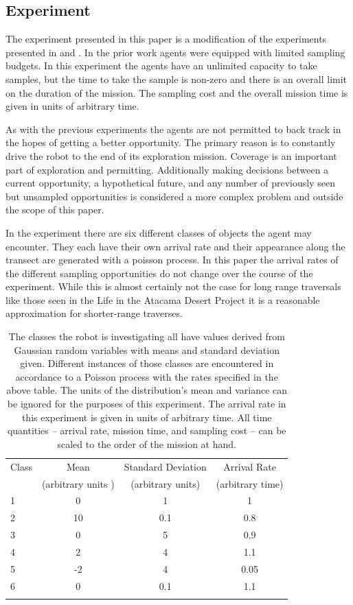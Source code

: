 \subsection{Experiment}

The experiment presented in this paper is a modification of the experiments
presented in \cite{furlong2014sequential} and \cite{furlong2014budgeting}.  In
the prior work agents were equipped with limited sampling budgets.  In this
experiment the agents have an unlimited capacity to take samples, but the time
to take the sample is non-zero and there is an overall limit on the duration of
the mission.  The sampling cost and the overall mission time is given in units of arbitrary time.

As with the previous experiments the agents are not permitted to back track in
the hopes of getting a better opportunity.  The primary reason is to constantly
drive the robot to the end of its exploration mission.  Coverage is an
important part of exploration and permitting.  Additionally making decisions
between a current opportunity, a hypothetical future, and any number of
previously seen but unsampled opportunities is considered a more complex
problem and outside the scope of this paper.

In the experiment there are six different classes of objects the agent may
encounter.  They each have their own arrival rate and their appearance along
the transect are generated with a poisson process.  In this paper the arrival
rates of the different sampling opportunities do not change over the course of
the experiment.  While this is almost certainly not the case for long range
traversals like those seen in the Life in the Atacama Desert Project it is a
reasonable approximation for shorter-range traverses.

\begin{table}[htpd!]
	\centering
	\begin{tabular}{l|ccc}
		Class & Mean & Standard Deviation & Arrival Rate\\
							 & (arbitrary units )  & (arbitrary units) & (arbitrary time)\\
 		\hline
		1 & 0 & 1 & 1\\
		2 & 10 & 0.1 & 0.8 \\
		3 & 0 & 5 & 0.9\\
		4 & 2 & 4 & 1.1\\
		5 & -2 & 4 & 0.05\\
		6 & 0 & 0.1 & 1.1\\
		\hline 
		\\
	\end{tabular}
	\caption{The classes the robot is investigating all have values derived from Gaussian random variables with means and standard deviation given.  Different instances of those classes are encountered in accordance to a Poisson process with the rates specified in the above table.  The units of the distribution's mean and variance can be ignored for the purposes of this experiment.  The arrival rate in this experiment is given in units of arbitrary time.  All time quantities -- arrival rate, mission time, and sampling cost -- can be scaled to the order of the mission at hand.}
	\label{tbl:classes}
\end{table}

